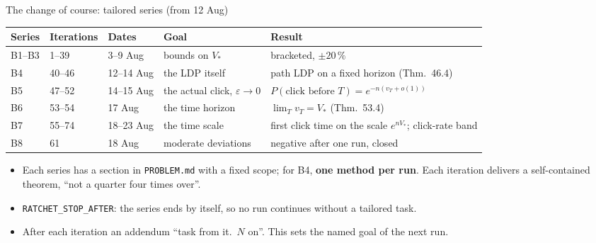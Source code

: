 \documentclass[11pt,aspectratio=169]{beamer}
\newcommand{\datei}[1]{\texttt{#1}}
\begin{document}
\begin{frame}{The change of course: tailored series (from 12 Aug)}
  \footnotesize
  \begin{tabular}{@{}llllp{}@{}}
    \toprule
    Series & Iterations & Dates & Goal & Result \\
    \midrule
    B1--B3 & 1--39 & 3--9 Aug & bounds on $V_\ast$ & bracketed, $\pm20\,\%$ \\
    B4 & 40--46 & 12--14 Aug & the LDP itself & path LDP on a fixed horizon (Thm.~46.4) \\
    B5 & 47--52 & 14--15 Aug & the actual click, $\varepsilon\to0$ & $P(\text{click before }T)=e^{-n(v_T+o(1))}$ \\
    B6 & 53--54 & 17 Aug & the time horizon & $\lim_T v_T=V_\ast$ (Thm.~53.4) \\
    B7 & 55--74 & 18--23 Aug & the time scale & first click time on the scale $e^{nV_\ast}$; click-rate band \\
    B8 & 61 & 18 Aug & moderate deviations & negative after one run, closed \\
    \bottomrule
  \end{tabular}

  \bigskip
  \begin{itemize}
  \item Each series has a section in \datei{PROBLEM.md} with a fixed scope; for B4,
    \textbf{one method per run}. Each iteration delivers a self-contained theorem,
    \enquote{not a quarter four times over}.
  \item \texttt{RATCHET\_STOP\_AFTER}: the series ends by itself, so no run continues
    without a tailored task.
  \item After each iteration an addendum \enquote{task from it.~$N$ on}. This sets the
    named goal of the next run.
  \end{itemize}
\end{frame}
\end{document}
